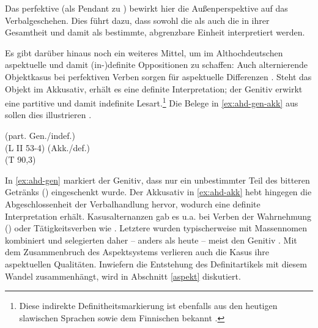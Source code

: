 \noindent
Das perfektive  (als Pendant zu ) bewirkt hier die Außenperspektive auf das Verbalgeschehen. Dies führt dazu, dass sowohl die  als auch die  in ihrer Gesamtheit und damit als bestimmte, abgrenzbare Einheit interpretiert werden. 

Es gibt darüber hinaus noch ein weiteres Mittel, um im Althochdeutschen aspektuelle und damit (in-)definite Oppositionen zu schaffen: Auch alternierende Objektkasus bei perfektiven Verben sorgen für aspektuelle Differenzen  \parencite{Donhauser1990,Leiss1994,Abraham1997,Philippi1997}. Steht das Objekt im Akkusativ, erhält es eine definite Interpretation; der Genitiv erwirkt eine partitive und damit indefinite Lesart.\footnote{Diese indirekte Definitheitsmarkierung ist ebenfalls aus den heutigen slawischen Sprachen sowie dem Finnischen bekannt \parencite[74]{Philippi1997}.} Die Belege in \ref{ex:ahd-gen-akk} aus \textcite[65]{Philippi1997} sollen dies illustrieren \parencite[vgl. auch][49]{Ferraresi2014}.

\begin{exe}
	\ex \label{ex:ahd-gen-akk}
		\begin{xlist}
		\ex \label{ex:ahd-gen}   (part. Gen./indef.) \\ 
		 (L II 53-4)
		\ex \label{ex:ahd-akk}   (Akk./def.) \\   (T 90,3)
		\end{xlist}
\end{exe}
\noindent
In \ref{ex:ahd-gen} markiert der Genitiv, dass nur ein unbestimmter Teil des bitteren Getränks () eingeschenkt wurde. Der Akkusativ in \ref{ex:ahd-akk} hebt hingegen die Abgeschlossenheit der Verbalhandlung hervor, wodurch  eine definite Interpretation erhält. Kasusalternanzen gab es u.a. bei Verben der Wahrnehmung () oder Tätigkeitsverben wie  \parencite[s.][100]{Donhauser1990}. Letztere wurden typischerweise mit Massennomen kombiniert und selegierten daher -- anders als heute --  meist den Genitiv \parencite[36]{Abraham1997}. Mit dem Zusammenbruch des Aspektsystems verlieren auch die Kasus ihre aspektuellen Qualitäten. Inwiefern die Entstehung des Definitartikels mit diesem Wandel zusammenhängt, wird in Abschnitt \ref{aspekt} diskutiert. 
 
